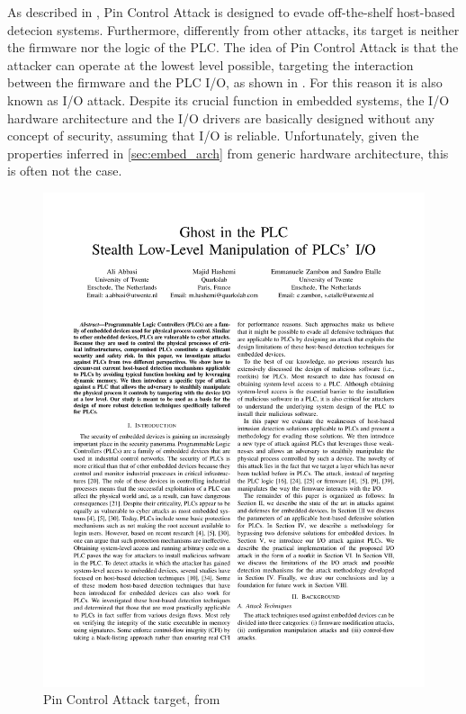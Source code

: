 As described in \cite{ghostplc}, Pin Control Attack is designed to evade off-the-shelf host-based detecion systems.
Furthermore, differently from other attacks, its target is neither the firmware nor the logic of the PLC.
The idea of Pin Control Attack is that the attacker can operate at the lowest level possible, targeting the interaction
between the firmware and the PLC I/O, as shown in \myfig{\ref{fig:target}}. For this reason it is also known as I/O attack.
Despite its crucial function in embedded systems, the I/O hardware architecture and the I/O drivers are basically designed
without any concept of security, assuming that I/O is reliable. Unfortunately, given the properties inferred in \sec \ref{sec:embed_arch}
from generic hardware architecture, this is often not the case.

\begin{figure}[h]
\centerline{\includegraphics[page=6,viewport=50 620 300 750,clip]{res/ghostplc}}
\caption{Pin Control Attack target, from \cite{ghostplc} \label{fig:target}}
\end{figure}


